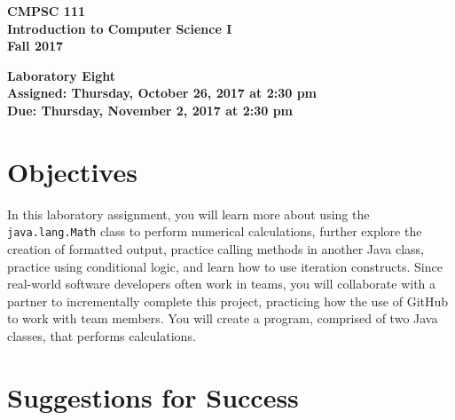 \documentclass[11pt]{article}
\newcommand{\assignmentduedate}{November 2}
\newcommand{\assignmentassignedate}{October 26}
\newcommand{\assignmentnumber}{Eight}
\newcommand{\labyear}{2017}
\newcommand{\labday}{Thursday}
\newcommand{\labtime}{2:30 pm}
\newcommand{\assigneddate}{Assigned: \labday, \assignmentassignedate, \labyear{} at \labtime{}}
\newcommand{\duedate}{Due: \labday, \assignmentduedate, \labyear{} at \labtime{}}
\newcommand{\labtitle}[1]
{
  \begin{center}
    \begin{center}
      \bf
      CMPSC 111\\Introduction to Computer Science I\\
      Fall 2017\\
      \medskip
    \end{center}
    \bf
    #1
  \end{center}
}
\begin{document}
\thispagestyle{empty}

\labtitle{Laboratory \assignmentnumber{} \\ \assigneddate{} \\ \duedate{}}

\section*{Objectives}

In this laboratory assignment, you will learn more about using the {\tt java.lang.Math} class to perform numerical
calculations, further explore the creation of formatted output, practice calling methods in another Java class, practice
using conditional logic, and learn how to use iteration constructs. Since real-world software developers often work in
teams, you will collaborate with a partner to incrementally complete this project, practicing how the use of GitHub to
work with team members. You will create a program, comprised of two Java classes, that performs calculations.

\section*{Suggestions for Success}
\end{document}
